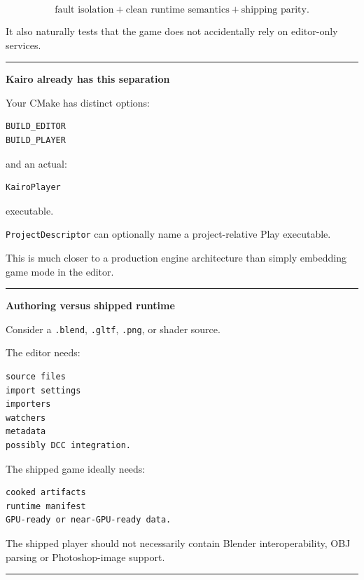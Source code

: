 \[
\boxed{
\text{fault isolation}
+
\text{clean runtime semantics}
+
\text{shipping parity}.
}
\]

It also naturally tests that the game does not accidentally rely on editor-only services.

\begin{center}\rule{0.5\linewidth}{0.5pt}\end{center}

\textbf{Kairo already has this separation}

Your CMake has distinct options:

\begin{verbatim}
BUILD_EDITOR
BUILD_PLAYER
\end{verbatim}

and an actual:

\begin{verbatim}
KairoPlayer
\end{verbatim}

executable.

\texttt{ProjectDescriptor} can optionally name a project-relative Play executable.

This is much closer to a production engine architecture than simply embedding game mode in the editor.

\begin{center}\rule{0.5\linewidth}{0.5pt}\end{center}

\textbf{Authoring versus shipped runtime}

Consider a \texttt{.blend}, \texttt{.gltf}, \texttt{.png}, or shader source.

The editor needs:

\begin{verbatim}
source files
import settings
importers
watchers
metadata
possibly DCC integration.
\end{verbatim}

The shipped game ideally needs:

\begin{verbatim}
cooked artifacts
runtime manifest
GPU-ready or near-GPU-ready data.
\end{verbatim}

The shipped player should not necessarily contain Blender interoperability, OBJ parsing or Photoshop-image support.

\begin{center}\rule{0.5\linewidth}{0.5pt}\end{center}

